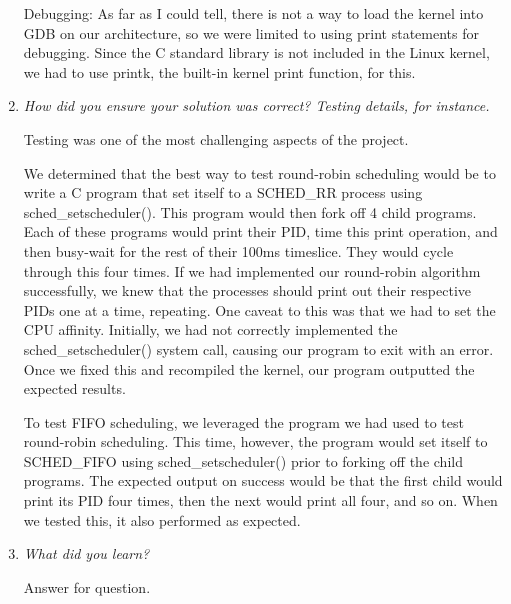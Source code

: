\documentclass[letterpaper,10pt,titlepage]{article}
\newcommand{\tab}{\hspace*{2em}} %
\begin{document}
\begin{enumerate}
\tab Debugging: As far as I could tell, there is not a way to load the kernel into GDB on our architecture, so we were limited to using print statements for debugging. Since the C standard library is not included in the Linux kernel, we had to use printk, the built-in kernel print function, for this.

\item \emph{How did you ensure your solution was correct? Testing details, for instance.}

\tab Testing was one of the most challenging aspects of the project. 

\tab We determined that the best way to test round-robin scheduling would be to write a C program that set itself to a SCHED_RR process using sched_setscheduler(). This program would then fork off 4 child programs. Each of these programs would print their PID, time this print operation, and then busy-wait for the rest of their 100ms timeslice. They would cycle through this four times. If we had implemented our round-robin algorithm successfully, we knew that the processes should print out their respective PIDs one at a time, repeating. One caveat to this was that we had to set the CPU affinity. Initially, we had not correctly implemented the sched_setscheduler() system call, causing our program to exit with an error. Once we fixed this and recompiled the kernel, our program outputted the expected results.

\tab To test FIFO scheduling, we leveraged the program we had used to test round-robin scheduling. This time, however, the program would set itself to SCHED_FIFO using sched_setscheduler() prior to forking off the child programs. The expected output on success would be that the first child would print its PID four times, then the next would print all four, and so on. When we tested this, it also performed as expected.


\item \emph{What did you learn?}

\tab Answer for question.

\end{enumerate}

%
\end{document}
